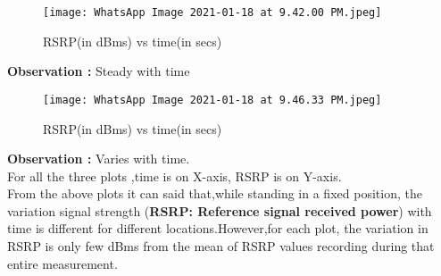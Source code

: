 \documentclass[11pt,a4paper]{article}
\begin{document}
\begin{SCfigure}[0.5][h]
    \centering
\caption{RSRP(in dBms) vs time(in secs)}
\texttt{[image: WhatsApp Image 2021-01-18 at 9.42.00 PM.jpeg]}
\end{SCfigure}
\textbf{Observation : } Steady with time
\vspace{0.5cm}
\begin{SCfigure}[0.5][h]
\caption{RSRP(in dBms) vs time(in secs)}
\texttt{[image: WhatsApp Image 2021-01-18 at 9.46.33 PM.jpeg]}
\end{SCfigure}



\textbf{Observation : } Varies with time.\\
\vspace{0.5cm}
For all the three plots ,time is on X-axis, RSRP is on Y-axis.\\
\vspace{8pt}
From the above plots it can said that,while standing in a fixed position, the variation signal strength (\textbf{RSRP: Reference signal received power}) with time is different for different locations.However,for each plot, the variation in RSRP is only few dBms from the mean of RSRP values recording during that entire measurement.
\end{document}
